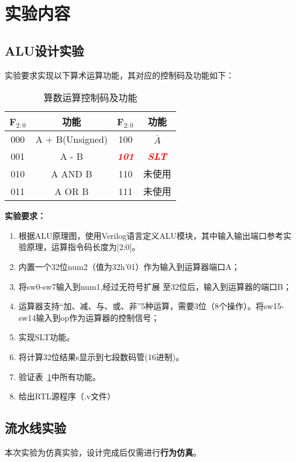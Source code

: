\section{实验内容}
\subsection{ALU设计实验}
实验要求实现以下算术运算功能，其对应的控制码及功能如下：
\begin{table}[htbp]
    \centering
    \begin{tabular}{cccc}
        \hline
         F$_{2:0}$ & 功能 & F$_{2:0}$ & 功能  \\
         \hline
         000 & A + B(Unsigned) & 100 & $\overline{A}$ \\
         001 & A - B & \textcolor{red}{\textit{\textbf{101}}} & \textcolor{red}{\textit{\textbf{SLT}}}\\
         010 & A AND B & 110 & 未使用\\
         011 & A OR B  & 111 & 未使用\\
         \hline
    \end{tabular}
    \caption{算数运算控制码及功能}
    \label{tab:opcode}
\end{table}

\textbf{实验要求：}
\begin{enumerate}
    \item 根据ALU原理图，使用Verilog语言定义ALU模块，其中输入输出端口参考实验原理，运算指令码长度为[2:0]。
    \item 内置一个32位num2（值为32h’01）作为输入到运算器端口A；
    \item 将sw0-sw7输入到num1,经过无符号扩展 至32位后，输入到运算器的端口B；
    \item 运算器支持“加、减、与、或、非”5种运算，需要3位（8个操作）。将sw15-sw14输入到op作为运算器的控制信号；
    \item 实现SLT功能。
    \item 将计算32位结果s显示到七段数码管(16进制)。
    \item 验证表~\ref{tab:opcode}中所有功能。
    \item 给出RTL源程序（.v文件）

\end{enumerate}

\subsection{流水线实验}

本次实验为仿真实验，设计完成后仅需进行\textbf{行为仿真}。

